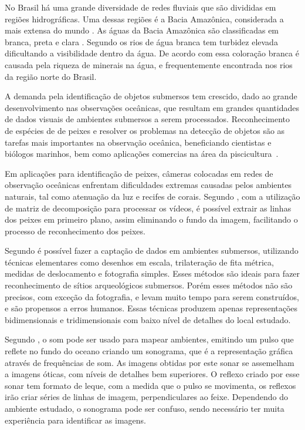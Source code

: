 
No Brasil há uma grande diversidade de redes fluviais que são divididas em regiões hidrográficas. Uma dessas regiões é a Bacia Amazônica, considerada a mais extensa do mundo \cite{portalbrasil:2009}. As águas da Bacia Amazônica são classificadas em branca, preta e clara \cite{sioli:2012}. Segundo  os rios de água branca tem turbidez elevada dificultando a visibilidade dentro da água. De acordo com  essa coloração branca é causada pela riqueza de minerais na água, e frequentemente encontrada nos rios da região norte do Brasil.


A demanda pela identificação de objetos submersos tem crescido, dado ao grande desenvolvimento nas observações oceânicas, que resultam em grandes quantidades de dados visuais de ambientes submersos a serem processados. Reconhecimento de espécies de de peixes e resolver os problemas na detecção de objetos são as tarefas mais importantes na observação oceânica, beneficiando cientistas e biólogos marinhos, bem como aplicações comercias na área da piscicultura~\cite{Qin:2016}. 


Em aplicações para identificação de peixes, câmeras colocadas em redes de observação oceânicas enfrentam dificuldades extremas causadas pelos ambientes naturais, tal como atenuação da luz e recifes de corais. Segundo , com a utilização de matriz de decomposição para processar os vídeos, é possível extrair as linhas dos peixes em primeiro plano, assim eliminando o fundo da imagem, facilitando o processo de reconhecimento dos peixes.


Segundo  é possível fazer a captação de dados em ambientes submersos, utilizando técnicas elementares como desenhos em escala, trilateração de fita métrica, medidas de deslocamento e fotografia simples. Esses métodos são ideais para fazer reconhecimento de sítios arqueológicos submersos. Porém esses métodos não são precisos, com exceção da fotografia, e levam muito tempo para serem construídos, e são propensos a erros humanos. Essas técnicas produzem apenas representações bidimensionais e tridimensionais com baixo nível de detalhes do local estudado.

Segundo , o som pode ser usado para mapear ambientes, emitindo um pulso que reflete no fundo do oceano criando um sonograma, que é a representação gráfica através de frequências de som. As imagens obtidas por este sonar se assemelham a imagens óticas, com níveis de detalhes bem superiores. O reflexo criado por esse sonar tem formato de leque, com a medida que o pulso se movimenta, os reflexos irão criar séries de linhas de imagem, perpendiculares ao feixe. Dependendo do ambiente estudado, o sonograma pode ser confuso, sendo necessário ter muita experiência para identificar as imagens.

